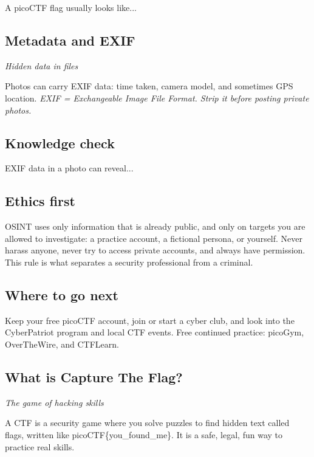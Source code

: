 \documentclass[12pt,openany]{book}
\begin{document}
A picoCTF flag usually looks like...

\medskip

\subsection*{Metadata and EXIF}
{\small\itshape\color{gray}Hidden data in files}


Photos can carry EXIF data: time taken, camera model, and sometimes GPS location.
{\small\itshape\color{gray}EXIF = Exchangeable Image File Format. Strip it before posting private photos.}

\medskip

\subsection*{Knowledge check}

EXIF data in a photo can reveal...

\medskip

\subsection*{Ethics first}


OSINT uses only information that is already public, and only on targets you are allowed to investigate: a practice account, a fictional persona, or yourself. Never harass anyone, never try to access private accounts, and always have permission. This rule is what separates a security professional from a criminal.

\medskip

\subsection*{Where to go next}


Keep your free picoCTF account, join or start a cyber club, and look into the CyberPatriot program and local CTF events. Free continued practice: picoGym, OverTheWire, and CTFLearn.

\medskip

\subsection*{What is Capture The Flag?}
{\small\itshape\color{gray}The game of hacking skills}


A CTF is a security game where you solve puzzles to find hidden text called flags, written like picoCTF\{you\_found\_me\}. It is a safe, legal, fun way to practice real skills.
\end{document}

